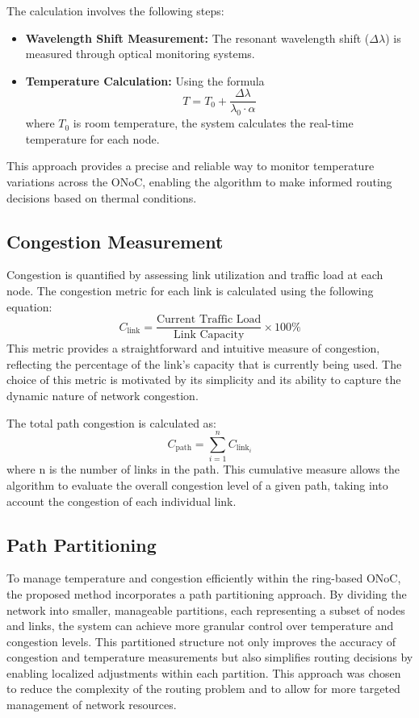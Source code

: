 \documentclass[12pt]{article}
\begin{document}
The calculation involves the following steps:
\begin{itemize}
    \item \textbf{Wavelength Shift Measurement:} The resonant wavelength shift (\(\Delta \lambda\)) is measured through optical monitoring systems.
    \item \textbf{Temperature Calculation:} Using the formula
    \begin{equation}
    T = T_0 + \frac{\Delta \lambda}{\lambda_0 \cdot \alpha}
    \end{equation}
    where \(T_0\) is room temperature, the system calculates the real-time temperature for each node.
\end{itemize}
This approach provides a precise and reliable way to monitor temperature variations across the ONoC, enabling the algorithm to make informed routing decisions based on thermal conditions.

\subsection{Congestion Measurement}
Congestion is quantified by assessing link utilization and traffic load at each node. The congestion metric for each link is calculated using the following equation:
\begin{equation}
    C_{\text{link}} = \frac{\text{Current Traffic Load}}{\text{Link Capacity}} \times 100\%
\end{equation}
This metric provides a straightforward and intuitive measure of congestion, reflecting the percentage of the link's capacity that is currently being used. The choice of this metric is motivated by its simplicity and its ability to capture the dynamic nature of network congestion.

The total path congestion is calculated as:
\begin{equation}
    C_{\text{path}} = \sum_{i=1}^{n} C_{\text{link}_i}
\end{equation}
where n is the number of links in the path. This cumulative measure allows the algorithm to evaluate the overall congestion level of a given path, taking into account the congestion of each individual link.

\subsection{Path Partitioning}
To manage temperature and congestion efficiently within the ring-based ONoC, the proposed method incorporates a path partitioning approach. By dividing the network into smaller, manageable partitions, each representing a subset of nodes and links, the system can achieve more granular control over temperature and congestion levels. This partitioned structure not only improves the accuracy of congestion and temperature measurements but also simplifies routing decisions by enabling localized adjustments within each partition. This approach was chosen to reduce the complexity of the routing problem and to allow for more targeted management of network resources.
\end{document}
